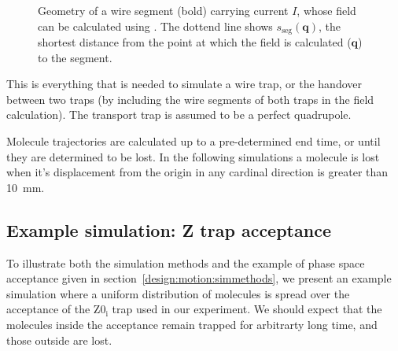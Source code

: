 \begin{figure}[h]
\centering
  \caption{Geometry of a wire segment (bold) carrying current $I$, whose field
  can be calculated using . The dottend line
  shows $s_\text{seg}(\mathbf{q})$, the shortest distance from the point at
  which the field is calculated ($\mathbf{q}$) to the segment.
  }
  \label{design:fig:wiresegment}
\end{figure}

This is everything that is needed to simulate a wire trap, or the handover
between two traps (by including the wire segments of both traps in the field
calculation). The transport trap is assumed to be a perfect quadrupole.

Molecule trajectories are calculated up to a pre-determined end time, or until
they are determined to be lost. In the following simulations a molecule is lost
when it's displacement from the origin in any cardinal direction is greater
than \SI{10}{\milli\meter}.

\subsection{Example simulation: Z trap acceptance}

To illustrate both the simulation methods and the example of phase space
acceptance given in section~\ref{design:motion:simmethods}, we present an
example simulation where a uniform distribution of molecules is spread over the
acceptance of the $\mathrm{Z0_i}$ trap used in our experiment. We should expect
that the molecules inside the acceptance remain trapped for arbitrarty long
time, and those outside are lost.

